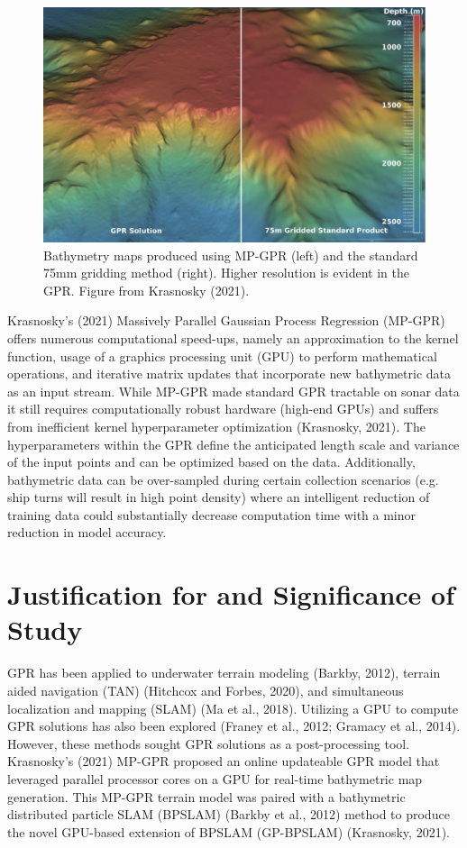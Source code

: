 \documentclass{article}
\begin{document}
\begin{figure}[htp]
    \centering
    \includegraphics[width=16cm]{Krasno_GPRvsStandard.jpg} %
    \caption[GPR is great]{Bathymetry maps produced using MP-GPR (left) and the standard 75mm gridding method (right). Higher resolution is evident in the GPR. Figure from Krasnosky (2021).} 
    \label{fig:kk} %
\end{figure}

Krasnosky's (2021) Massively Parallel Gaussian Process Regression (MP-GPR) offers numerous computational speed-ups, namely an approximation to the kernel function, usage of a graphics processing unit (GPU) to perform mathematical operations, and iterative matrix updates that incorporate new bathymetric data as an input stream. While MP-GPR made standard GPR tractable on sonar data it still requires computationally robust hardware (high-end GPUs) and suffers from inefficient kernel hyperparameter optimization (Krasnosky, 2021). The hyperparameters within the GPR define the anticipated length scale and variance of the input points and can be optimized based on the data. Additionally, bathymetric data can be over-sampled during certain collection scenarios (e.g. ship turns will result in high point density) where an intelligent reduction of training data could substantially decrease computation time with a minor reduction in model accuracy. 



\section{Justification for and Significance of Study}
GPR has been applied to underwater terrain modeling (Barkby, 2012), terrain aided navigation (TAN) (Hitchcox and Forbes, 2020), and simultaneous localization and mapping (SLAM) (Ma et al., 2018). Utilizing a GPU to compute GPR solutions has also been explored (Franey et al., 2012; Gramacy et al., 2014).  However, these methods sought GPR solutions as a post-processing tool. Krasnosky's (2021) MP-GPR proposed an online updateable GPR model that leveraged parallel processor cores on a GPU for real-time bathymetric map generation. This MP-GPR terrain model was paired with a bathymetric distributed particle SLAM (BPSLAM) (Barkby et al., 2012) method to produce the novel GPU-based extension of BPSLAM (GP-BPSLAM) (Krasnosky, 2021).
\end{document}
